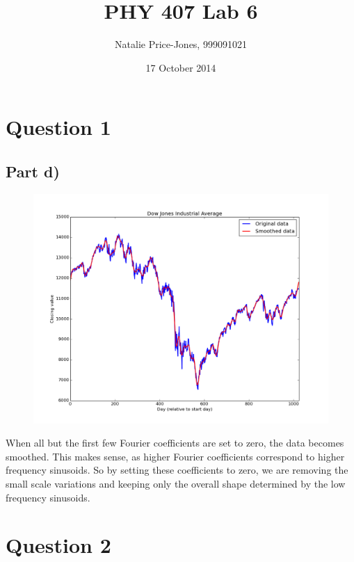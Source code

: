 \documentclass[a4paper,12pt]{article}
\begin{document}
\onehalfspacing
\title{PHY 407 Lab 6}
\author{Natalie Price-Jones, 999091021}
\date{17 October 2014}
\maketitle

\section{Question 1}

\subsection{Part d)}

\begin{figure}[H]
\centering
\includegraphics[width = \linewidth]{lab5q1.png}
\caption{}
\label{fig:q1}
\end{figure}

When all but the first few Fourier coefficients are set to zero, the data becomes smoothed. This makes sense, as higher Fourier coefficients correspond to higher frequency sinusoids. So by setting these coefficients to zero, we are removing the small scale variations and keeping only the overall shape determined by the low frequency sinusoids.

\section{Question 2}
\end{document}
